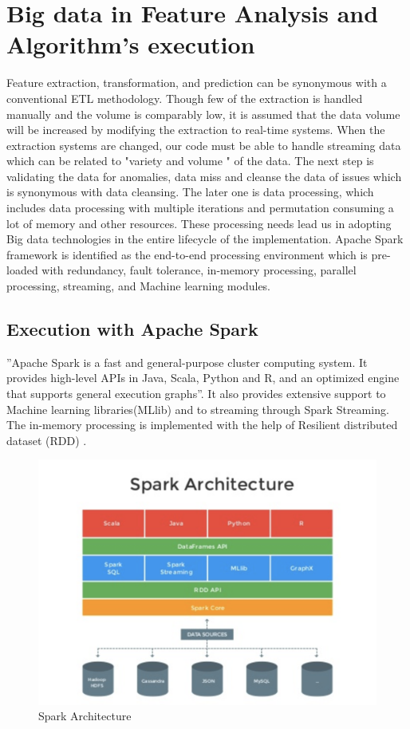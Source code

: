 \documentclass[sigconf]{acmart}
\begin{document}
\section{Big data in Feature Analysis and Algorithm's execution}
Feature extraction, transformation, and prediction can be synonymous with a conventional ETL methodology. Though few of the extraction is handled manually and the volume is comparably low, it is assumed that the data volume will be increased by modifying the extraction to real-time systems. When the extraction systems are changed, our code must be able to handle streaming data which can be related to "variety and volume " of the data. The next step is validating the data for anomalies, data miss and cleanse the data of issues which is synonymous with data cleansing. The later one is data processing, which includes data processing with multiple iterations and permutation consuming a lot of memory and other resources. These processing needs lead us in adopting Big data technologies in the entire lifecycle of the implementation.
Apache Spark framework is identified as the end-to-end processing environment which is pre-loaded with redundancy, fault tolerance, in-memory processing, parallel processing, streaming, and Machine learning modules.

\subsection{Execution with Apache Spark}
''Apache Spark is a fast and general-purpose cluster computing system. It provides high-level APIs in Java, Scala, Python and R, and an optimized engine that supports general execution graphs''. It also provides extensive support to Machine learning libraries(MLlib) and to streaming through Spark Streaming. The in-memory processing is implemented with the help of Resilient distributed dataset (RDD) \cite{5:online}.

\begin{figure}[!ht]
  \centering\includegraphics[width=\columnwidth]{images/Sparkarchic.png}
  \caption{Spark Architecture \cite{sparkarchitecture:fig}}
  \label{fig:sparkarchi}
\end{figure}
\end{document}
